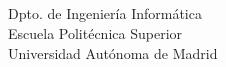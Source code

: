 \chapter*{}

\vspace*{0.2cm}

\begin{center}

\Huge \MakeUppercase{\textbf{\titulo}}

\vspace{7cm}

\Large \autor \\
\Large \tutor \\


\vspace{6cm}


Dpto. de Ingeniería Informática \\
Escuela Politécnica Superior \\
Universidad Autónoma de Madrid \\
\fecha

\end{center}

\normalsize

\newpage \thispagestyle{empty} %

